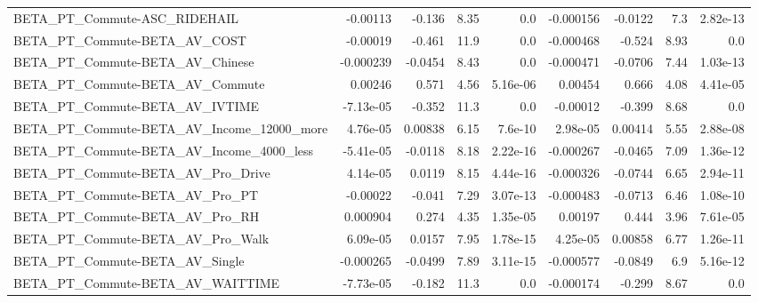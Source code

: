 \begin{tabular}{lrrrrrrrr}
BETA\_PT\_Commute-ASC\_RIDEHAIL                       &    -0.00113 &       -0.136 &      8.35 &      0.0 &  -0.000156 &     -0.0122 &          7.3 &      2.82e-13 \\
BETA\_PT\_Commute-BETA\_AV\_COST                       &    -0.00019 &       -0.461 &      11.9 &      0.0 &  -0.000468 &      -0.524 &         8.93 &           0.0 \\
BETA\_PT\_Commute-BETA\_AV\_Chinese                    &   -0.000239 &      -0.0454 &      8.43 &      0.0 &  -0.000471 &     -0.0706 &         7.44 &      1.03e-13 \\
BETA\_PT\_Commute-BETA\_AV\_Commute                    &     0.00246 &        0.571 &      4.56 & 5.16e-06 &    0.00454 &       0.666 &         4.08 &      4.41e-05 \\
BETA\_PT\_Commute-BETA\_AV\_IVTIME                     &   -7.13e-05 &       -0.352 &      11.3 &      0.0 &   -0.00012 &      -0.399 &         8.68 &           0.0 \\
BETA\_PT\_Commute-BETA\_AV\_Income\_12000\_more          &    4.76e-05 &      0.00838 &      6.15 &  7.6e-10 &   2.98e-05 &     0.00414 &         5.55 &      2.88e-08 \\
BETA\_PT\_Commute-BETA\_AV\_Income\_4000\_less           &   -5.41e-05 &      -0.0118 &      8.18 & 2.22e-16 &  -0.000267 &     -0.0465 &         7.09 &      1.36e-12 \\
BETA\_PT\_Commute-BETA\_AV\_Pro\_Drive                  &    4.14e-05 &       0.0119 &      8.15 & 4.44e-16 &  -0.000326 &     -0.0744 &         6.65 &      2.94e-11 \\
BETA\_PT\_Commute-BETA\_AV\_Pro\_PT                     &    -0.00022 &       -0.041 &      7.29 & 3.07e-13 &  -0.000483 &     -0.0713 &         6.46 &      1.08e-10 \\
BETA\_PT\_Commute-BETA\_AV\_Pro\_RH                     &    0.000904 &        0.274 &      4.35 & 1.35e-05 &    0.00197 &       0.444 &         3.96 &      7.61e-05 \\
BETA\_PT\_Commute-BETA\_AV\_Pro\_Walk                   &    6.09e-05 &       0.0157 &      7.95 & 1.78e-15 &   4.25e-05 &     0.00858 &         6.77 &      1.26e-11 \\
BETA\_PT\_Commute-BETA\_AV\_Single                     &   -0.000265 &      -0.0499 &      7.89 & 3.11e-15 &  -0.000577 &     -0.0849 &          6.9 &      5.16e-12 \\
BETA\_PT\_Commute-BETA\_AV\_WAITTIME                   &   -7.73e-05 &       -0.182 &      11.3 &      0.0 &  -0.000174 &      -0.299 &         8.67 &           0.0 \\

\end{tabular}
